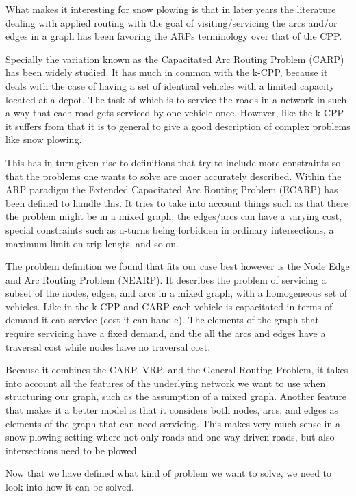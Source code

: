 What makes it interesting for snow plowing is that in later years the literature dealing with applied routing with the goal of visiting/servicing the arcs and/or edges in a graph has been favoring the ARPs terminology over that of the CPP.

Specially the variation known as the Capacitated Arc Routing Problem (CARP) has been widely studied. It has much in common with the k-CPP, because it deals with the case of having a set of identical vehicles with a limited capacity located at a depot. The task of which is to service the roads in a network in such a way that each road gets serviced by one vehicle once. However, like the k-CPP it suffers from that it is to general to give a good description of complex problems like snow plowing.

This has in turn given rise to definitions that try to include more constraints so that the problems one wants to solve are moer accurately described. Within the ARP paradigm the Extended Capacitated Arc Routing Problem (ECARP) has been defined to handle this. It tries to take into account things such as that there the problem might be in a mixed graph, the edges/arcs can have a varying cost, special constraints such as u-turns being forbidden in ordinary intersections, a maximum limit on trip lengts, and so on.

The problem definition we found that fits our case best however is the Node Edge and Arc Routing Problem (NEARP). It describes the problem of servicing a subset of the nodes, edges, and arcs in a mixed graph, with a homogeneous set of vehicles. Like in the k-CPP and CARP each vehicle is capacitated in terms of demand it can service (cost it can handle). The elements of the graph that require servicing have a fixed demand, and the all the arcs and edges have a traversal cost while nodes have no traversal cost. 

Because it combines the CARP, VRP, and the General Routing Problem, it takes into account all the features of the underlying network we want to use when structuring our graph, such as the assumption of a mixed graph. Another feature that makes it a better model is that it considers both nodes, arcs, and edges as elements of the graph that can need servicing. This makes very much sense in a snow plowing setting where not only roads and one way driven roads, but also intersections need to be plowed.

Now that we have defined what kind of problem we want to solve, we need to look into how it can be solved.


